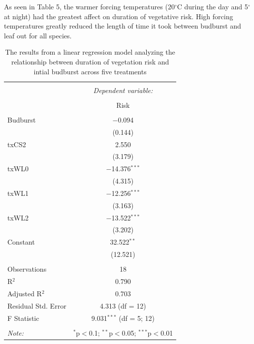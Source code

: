 \documentclass{article}\usepackage[]{graphicx}\usepackage[]{color}
\begin{document}
As seen in Table 5, the warmer forcing temperatures (20$^{\circ}$C during the day and 5$^{\circ}$ at night) had the greatest affect on duration of vegetative risk. High forcing temperatures greatly reduced the length of time it took between budburst and leaf out for all species. 


\begin{table}[!htbp] \centering 
  \caption{The results from a linear regression model analyzing the relationship between duration of vegetation risk and intial budburst across five treatments} 
  \label{} 
\begin{tabular}{@{\extracolsep{5pt}}lc} 
\\[-1.8ex]\hline 
\hline \\[-1.8ex] 
 & \multicolumn{1}{c}{\textit{Dependent variable:}} \\ 
\cline{2-2} 
\\[-1.8ex] & Risk \\ 
\hline \\[-1.8ex] 
 Budburst & $-$0.094 \\ 
  & (0.144) \\ 
  txCS2 & 2.550 \\ 
  & (3.179) \\ 
  txWL0 & $-$14.376$^{***}$ \\ 
  & (4.315) \\ 
  txWL1 & $-$12.256$^{***}$ \\ 
  & (3.163) \\ 
  txWL2 & $-$13.522$^{***}$ \\ 
  & (3.202) \\ 
  Constant & 32.522$^{**}$ \\ 
  & (12.521) \\ 
 \hline \\[-1.8ex] 
Observations & 18 \\ 
R$^{2}$ & 0.790 \\ 
Adjusted R$^{2}$ & 0.703 \\ 
Residual Std. Error & 4.313 (df = 12) \\ 
F Statistic & 9.031$^{***}$ (df = 5; 12) \\ 
\hline 
\hline \\[-1.8ex] 
\textit{Note:}  & \multicolumn{1}{r}{$^{*}$p$<$0.1; $^{**}$p$<$0.05; $^{***}$p$<$0.01} \\ 
\end{tabular} 
\end{table} 
\end{document}

